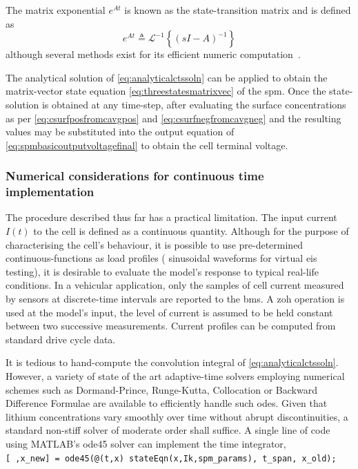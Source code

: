 The matrix exponential $e^{At}$ is known as the state-transition matrix and is
defined as
\begin{equation}
    e^{A t} ≜ \mathcal{L}^{-1}\left\{(s I - A)^{-1}\right\}
\end{equation}
although several methods exist for its efficient numeric
computation~\cite{Moler2003}.

The  analytical  solution  of \cref{eq:analyticalctssoln}   can  be  applied  to
obtain  the matrix-vector  state equation \cref{eq:threestatesmatrixvec}  of the
\gls{spm}.  Once  the  state-solution  is   obtained  at  any  time-step,  after
evaluating  the  surface   concentrations  as  per \cref{eq:csurfposfromcavgpos}
and \cref{eq:csurfnegfromcavgneg} and  the resulting  values may  be substituted
into the  output equation of \cref{eq:spmbasicoutputvoltagefinal} to  obtain the
cell terminal voltage.

\subsubsection*{Numerical considerations for continuous time implementation}

The procedure described  thus far has a practical limitation.  The input current
$I(t)$ to the cell is defined as a continuous quantity. Although for the purpose
of characterising  the cell's  behaviour, it is  possible to  use pre-determined
continuous-functions as  load profiles  (\eg{} sinusoidal waveforms  for virtual
\gls{eis} testing), it is desirable to  evaluate the model's response to typical
real-life  conditions. In  a vehicular  application,  only the  samples of  cell
current  measured by  sensors at  discrete-time  intervals are  reported to  the
\gls{bms}. A \gls{zoh}  operation is used at the model's  input, \ie{} the level
of current is  assumed to be held constant between  two successive measurements.
Current profiles can be computed from standard drive cycle data.

It     is    tedious     to     hand-compute     the    convolution     integral
of \cref{eq:analyticalctssoln}.  However,   a  variety  of  state   of  the  art
adaptive-time  solvers  employing  numerical  schemes  such  as  Dormand-Prince,
Runge-Kutta,  Collocation  or  Backward  Difference Formulae  are  available  to
efficiently  handle such  \glspl{ode}.  Given that  lithium concentrations  vary
smoothly  over  time  without   abrupt  discontinuities,  a  standard  non-stiff
solver  of  moderate   order  shall  suffice.  A  single  line   of  code  using
\textsc{MATLAB}'s  ode45 solver  can  implement the  time  integrator, \eg{}  \\
\texttt{[~,x_new] =  ode45(@(t,x) stateEqn(x,Ik,spm_params), t_span,
x_old); }

